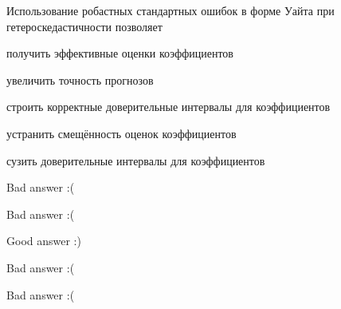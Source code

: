 
\begin{question}
Использование робастных стандартных ошибок в форме Уайта при гетероскедастичности позволяет
\begin{answerlist}
  \item получить эффективные оценки коэффициентов
  \item увеличить точность прогнозов
  \item строить корректные доверительные интервалы для коэффициентов
  \item устранить смещённость оценок коэффициентов
  \item сузить доверительные интервалы для коэффициентов
\end{answerlist}
\end{question}

\begin{solution}
\begin{answerlist}
  \item Bad answer :(
  \item Bad answer :(
  \item Good answer :)
  \item Bad answer :(
  \item Bad answer :(
\end{answerlist}
\end{solution}

